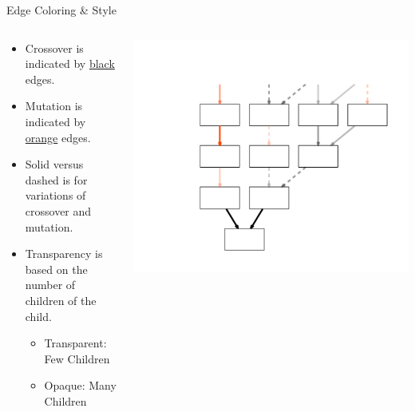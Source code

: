 \documentclass{beamer}
\begin{document}
\begin{frame}{Edge Coloring \& Style}
\begin{columns}
\begin{column}{.47\textwidth}
\begin{itemize}
\item Crossover is indicated by \underline{black} edges.
\item Mutation is indicated by \underline{\color{orange} orange}  edges.
\item Solid versus dashed is for variations of crossover and mutation.
\item Transparency is based on the number of children of the child.
\begin{itemize}
\item Transparent: Few Children
\item Opaque: Many Children
\end{itemize}
\end{itemize} 
\end{column}
\begin{column}{.6\textwidth}
\includegraphics[width=\textwidth]{Illustrations/family_edges.pdf} 
\end{column}
\end{columns}
\end{frame}
\end{document}
